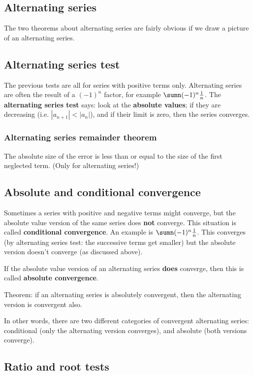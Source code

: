 \subsection{Alternating series}
The two theorems about alternating series are fairly obvious if we draw a picture of an alternating series.

\subsection{Alternating series test}
The previous tests are all for series with positive terms only. Alternating series are often the result of a $(-1)^n$ factor, for example $\sumn (-1)^n \frac{1}{n}$. The \textbf{alternating series test} says: look at the \textbf{absolute values}; if they are decreasing (i.e. $|a_{n+1}| < |a_n|$), and if their limit is zero, then the series converges.


\subsubsection{Alternating series remainder theorem}
The absolute size of the error is less than or equal to the size of the first neglected term. (Only for alternating series!)


\subsection{Absolute and conditional convergence}

Sometimes a series with positive and negative terms might converge, but the absolute value version of the same series does \textbf{not} converge. This situation is called \textbf{conditional convergence}. An example is $\sumn (-1)^n \frac{1}{n}$. This converges (by alternating series test: the successive terms get smaller) but the absolute version doesn't converge (as discussed above).

If the absolute value version of an alternating series \textbf{does} converge, then this is called \textbf{absolute convergence}.

Theorem: if an alternating series is absolutely convergent, then the alternating version is convergent also.

In other words, there are two different categories of convergent alternating series: conditional (only the alternating version converges), and absolute (both versions converge).

\subsection{Ratio and root tests}

